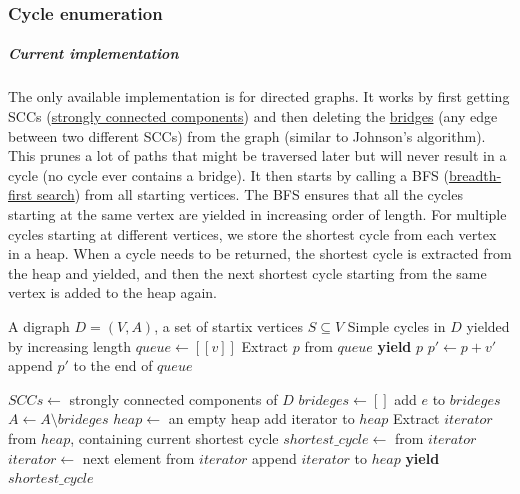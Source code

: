
\subsubsection{Cycle enumeration}
\subparagraph{Current implementation}
The only available implementation is for directed graphs. It works by first
getting SCCs
(\href{https://en.wikipedia.org/wiki/Strongly_connected_component}{strongly
    connected components}) and then deleting the
\href{https://en.wikipedia.org/wiki/Bridge_(graph_theory)}{bridges} (any edge
between two different SCCs) from the graph (similar to Johnson’s
algorithm\cite{johnson1975}). This prunes a lot of paths that might be
traversed later but will never result in a cycle (no cycle ever contains a
bridge). It then starts by calling a BFS
(\href{https://en.wikipedia.org/wiki/Breadth-first_search}{breadth-first
    search}) from all starting vertices. The BFS ensures that all the cycles
starting at the same vertex are yielded in increasing order of length. For
multiple cycles starting at different vertices, we store the shortest cycle
from each vertex in a heap. When a cycle needs to be returned, the shortest
cycle is extracted from the heap and yielded, and then the next shortest cycle
starting from the same vertex is added to the heap again.

\begin{algorithm}[H]
    \caption{$simple\ cycles\ in\ a\ directed\ graph$}
    \begin{algorithmic}[1]
        \Require A digraph $D = (V,A)$, a set of startix vertices $S \subseteq V$
        \Ensure Simple cycles in $D$ yielded by increasing length
        \State $queue \gets [[v]]$
        \State Extract $p$ from $queue$
        \State \textbf{yield} $p$
        \Else
        \State $p' \gets p + v'$
        \State append $p'$ to the end of $queue$
        \EndIf
        \EndFor
        \EndIf
        \EndWhile
        \EndFunction

        \State $SCCs \gets$ strongly connected components of $D$
        \State $brideges \gets []$
        \State add $e$ to $brideges$
        \EndIf
        \EndFor
        \EndFor
        \State $A \gets A \setminus brideges$
        \State $heap \gets$ an empty heap
        \State add iterator  to $heap$
        \EndFor
        \State Extract $iterator$ from $heap$, containing current shortest cycle
        \State $shortest\_cycle \gets$ from $iterator$
        \State $iterator \gets$ next element from $iterator$
        \State append $iterator$ to $heap$
        \EndIf
        \State \textbf{yield} $shortest\_cycle$
        \EndWhile
        \EndFunction
    \end{algorithmic}
\end{algorithm}

